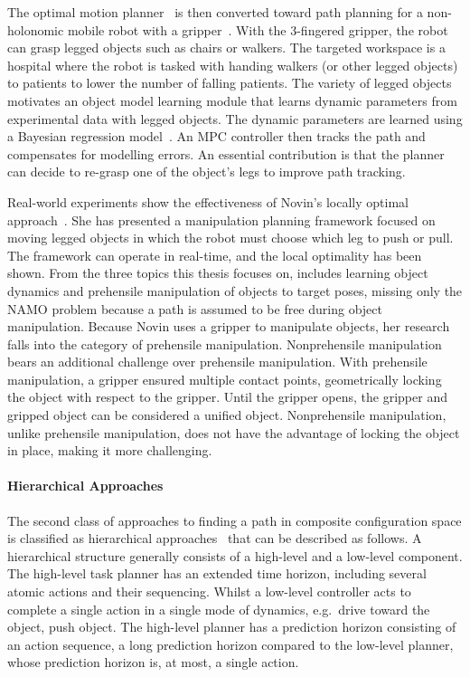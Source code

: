 The optimal motion planner~\cite{sabbaghnovin_optimal_2016} is then converted toward path planning for a non-holonomic mobile robot with a gripper~\cite{novin_dynamic_2018}. With the 3-fingered gripper, the robot can grasp legged objects such as chairs or walkers. The targeted workspace is a hospital where the robot is tasked with handing walkers (or other legged objects) to patients to lower the number of falling patients. The variety of legged objects motivates an object model learning module that learns dynamic parameters from experimental data with legged objects. The dynamic parameters are learned using a Bayesian regression model~\cite{scholz_navigation_2016}. An \ac{MPC} controller then tracks the path and compensates for modelling errors. An essential contribution is that the planner can decide to re-grasp one of the object's legs to improve path tracking.\bs

Real-world experiments show the effectiveness of Novin's locally optimal approach~\cite{sabbaghnovin_model_2021}. She has presented a manipulation planning framework focused on moving legged objects in which the robot must choose which leg to push or pull. The framework can operate in real-time, and the local optimality has been shown. From the three topics this thesis focuses on, \citeauthor{sabbaghnovin_model_2021} includes learning object dynamics and prehensile manipulation of objects to target poses, missing only the \ac{NAMO} problem because a path is assumed to be free during object manipulation. Because Novin uses a gripper to manipulate objects, her research falls into the category of prehensile manipulation. Nonprehensile manipulation bears an additional challenge over prehensile manipulation. With prehensile manipulation, a gripper ensured multiple contact points, geometrically locking the object with respect to the gripper. Until the gripper opens, the gripper and gripped object can be considered a unified object. Nonprehensile manipulation, unlike prehensile manipulation, does not have the advantage of locking the object in place, making it more challenging.

\paragraph{Hierarchical Approaches}
The second class of approaches to finding a path in composite configuration space is classified as hierarchical approaches~\cite{ellis_navigation_2022,krontiris_dealing_2015,scholz_navigation_2016,vega-brown_asymptotically_2020,wang_affordancebased_2020} that can be described as follows. A hierarchical structure generally consists of a high-level and a low-level component. The high-level task planner has an extended time horizon, including several atomic actions and their sequencing. Whilst a low-level controller acts to complete a single action in a single mode of dynamics, e.g.~drive toward the object, push object. The high-level planner has a prediction horizon consisting of an action sequence, a long prediction horizon compared to the low-level planner, whose prediction horizon is, at most, a single action.\bs

